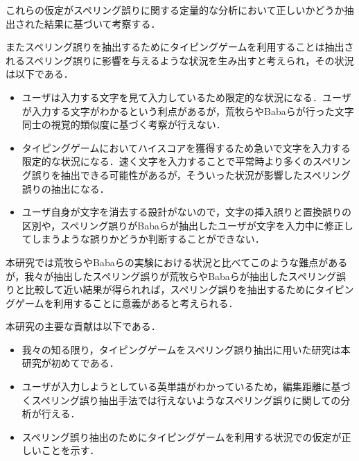 これらの仮定がスペリング誤りに関する定量的な分析において正しいかどうか抽出された結果に基づいて考察する．

またスペリング誤りを抽出するためにタイピングゲームを利用することは抽出されるスペリング誤りに影響を与えるような状況を生み出すと考えられ，その状況は以下である．

\begin{itemize}
 \item ユーザは入力する文字を見て入力しているため限定的な状況になる．ユーザが入力する文字がわかるという利点があるが，荒牧ら\cite{aramakiNLP2010}やBabaら\cite{babaACL2012}が行った文字同士の視覚的類似度に基づく考察が行えない．
 \item タイピングゲームにおいてハイスコアを獲得するため急いで文字を入力する限定的な状況になる．速く文字を入力することで平常時より多くのスペリング誤りを抽出できる可能性があるが，そういった状況が影響したスペリング誤りの抽出になる．
 \item ユーザ自身が文字を消去する設計がないので，文字の挿入誤りと置換誤りの区別や，スペリング誤りがBabaらが抽出したユーザが文字を入力中に修正してしまうような誤り\cite{babaACL2012}かどうか判断することができない．
\end{itemize}

本研究では荒牧ら\cite{aramakiNLP2010}やBabaら\cite{babaACL2012}の実験における状況と比べてこのような難点があるが，我々が抽出したスペリング誤りが荒牧らやBabaらが抽出したスペリング誤りと比較して近い結果が得られれば，スペリング誤りを抽出するためにタイピングゲームを利用することに意義があると考えられる．

本研究の主要な貢献は以下である．

\begin{itemize}
 \item 我々の知る限り，タイピングゲームをスペリング誤り抽出に用いた研究は本研究が初めてである．
 \item ユーザが入力しようとしている英単語がわかっているため，編集距離に基づくスペリング誤り抽出手法\cite{aramakiNLP2010}では行えないようなスペリング誤りに関しての分析が行える．
 \item スペリング誤り抽出のためにタイピングゲームを利用する状況での仮定が正しいことを示す．
\end{itemize}
